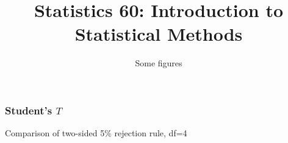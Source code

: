 \documentclass[handout]{beamer}
\title{Statistics 60: Introduction to Statistical Methods}
\subtitle{Some figures}
\author{}%
\begin{document}
   \begin{frame}
   \titlepage
   \end{frame}



   \begin{frame}
   \frametitle{Student's $T$}
   \begin{center}
   \end{center}
   Comparison of two-sided {\color{blue} 5\% rejection rule}, df=4
   \end{frame}

\end{document}
